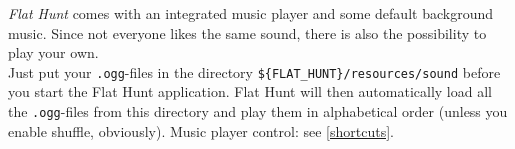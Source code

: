 \emph{Flat Hunt} comes with an integrated music player and some default background music. Since not everyone likes the same sound, there is also the possibility to play your own.\\ 
Just put your \texttt{.ogg}-files in the directory \texttt{\$\{FLAT\_HUNT\}/resources/sound} before you start the Flat Hunt application. Flat Hunt will then automatically load all the \texttt{.ogg}-files from this directory and play them in alphabetical order (unless you enable shuffle, obviously). Music player control: see \autoref{shortcuts}.
